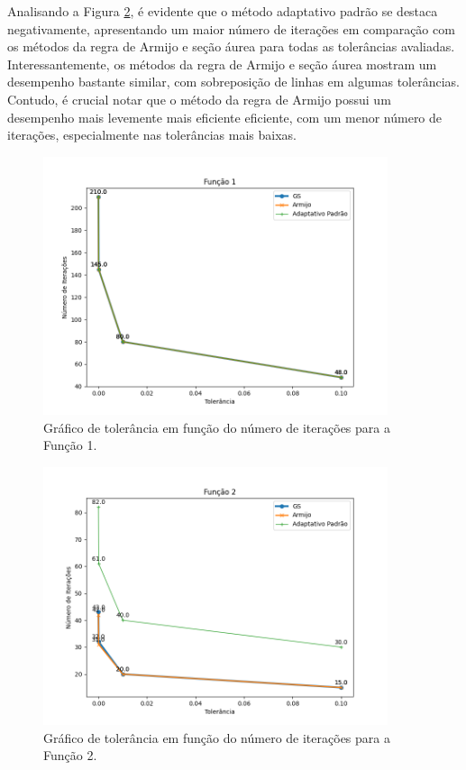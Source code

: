 \documentclass{article}
\begin{document}
Analisando a Figura \ref{fig:graf_funcao2}, é evidente que o método adaptativo padrão se destaca negativamente, apresentando um maior número de iterações em comparação com os métodos da regra de Armijo e seção áurea para todas as tolerâncias avaliadas. Interessantemente, os métodos da regra de Armijo e seção áurea mostram um desempenho bastante similar, com sobreposição de linhas em algumas tolerâncias. Contudo, é crucial notar que o método da regra de Armijo possui um desempenho mais levemente mais eficiente eficiente, com um menor número de iterações, especialmente nas tolerâncias mais baixas.

\begin{figure}[h]
  \centering
  \includegraphics[width=0.9\textwidth]{funcao_1_otimizacao.png}
  \caption{Gráfico de tolerância em função do número de iterações para a Função 1.}
  \label{fig:graf_funcao1}
\end{figure}

\begin{figure}[h]
  \centering
  \includegraphics[width=0.9\textwidth]{funcao_2_otimizacao.png}
  \caption{Gráfico de tolerância em função do número de iterações para a Função 2.}
  \label{fig:graf_funcao2}
\end{figure}
\end{document}
